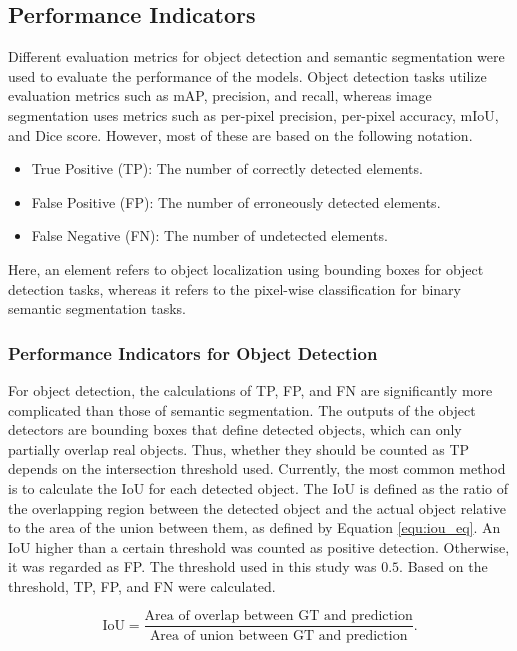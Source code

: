 \documentclass{ieeeaccess}
\begin{document}
\subsection{Performance Indicators}
Different evaluation metrics for object detection and semantic segmentation were used to evaluate the performance of the models. Object detection tasks utilize evaluation metrics such as mAP, precision, and recall, whereas image segmentation uses metrics such as per-pixel precision, per-pixel accuracy, mIoU, and Dice score. However, most of these are based on the following notation. 

\begin{itemize}
    \item True Positive (TP): The number of correctly detected elements.
    \item False Positive (FP): The number of erroneously detected elements.
    \item False Negative (FN): The number of undetected elements.
\end{itemize}

Here, an element refers to object localization using bounding boxes for object detection tasks, whereas it refers to the pixel-wise classification for binary semantic segmentation tasks.

\subsubsection{Performance Indicators for Object Detection}
For object detection, the calculations of TP, FP, and FN are significantly more complicated than those of semantic segmentation. The outputs of the object detectors are bounding boxes that define detected objects, which can only partially overlap real objects. Thus, whether they should be counted as TP depends on the intersection threshold used. Currently, the most common method is to calculate the IoU for each detected object. The IoU is defined as the ratio of the overlapping region between the detected object and the actual object relative to the area of the union between them, as defined by Equation \ref{equ:iou_eq}. An IoU higher than a certain threshold was counted as positive detection. Otherwise, it was regarded as FP. The threshold used in this study was $0.5$. Based on the threshold, TP, FP, and FN were calculated.

\begin{equation}     
    \text{IoU} = \frac{\text{Area of overlap between GT and prediction}}{\text{Area of union between GT and prediction}} .
    \label{equ:iou_eq}
 \end{equation}
\end{document}
